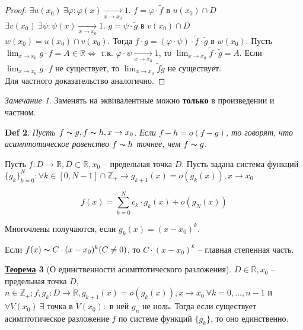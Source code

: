 \documentclass[12pt]{article}
\def\R{\mathbb{R}}       %
\def\Z{\mathbb{Z}}       %
\def\PHI{\varphi}        %
\def\EQ{\Leftrightarrow} %
\theoremstyle{definition} %
\newtheorem{Thm}{\underline{Теорема}}[subsection] %
\theoremstyle{plain} %
\newtheorem{Def}[Thm]{Def} %
\theoremstyle{remark} %
\newtheorem{Rem}[Thm]{Замечание} %
\begin{document}
\begin{proof}
    $\exists u(x_0) \ \exists \PHI : \PHI(x) \xrightarrow[x \to x_0]{} 1$. $f = \PHI \cdot \widetilde{f}$ в $u(x_0) \cap D$ \\
    $\exists v(x_0) \ \exists \psi : \psi(x) \xrightarrow[x \to x_0]{} 1$. $g = \psi \cdot \widetilde{g}$ в $v(x_0) \cap D$ \\
    $w(x_0) = u(x_0) \cap v(x_0)$. Тогда $f \cdot g = (\PHI \cdot \psi) \cdot \widetilde{f} \cdot \widetilde{g}$ в $w(x_0)$.
    Пусть $\lim_{x \to x_0} g \cdot f = A \in \R \EQ$ т.к. $\PHI \cdot \psi \xrightarrow[x \to x_0]{} 1$, то $\lim_{x \to x_0} \widetilde{f} \cdot \widetilde{g} = A$.
    Если $\lim_{x \to x_0} g \cdot f$ не существует, то $\lim_{x \to x_0} \widetilde{f}\widetilde{g}$ не существует.  \\
    Для частного доказательство аналогично.    
\end{proof}

\begin{Rem}
    Заменять на эквивалентные можно \textbf{только} в произведении и частном.
\end{Rem}

\begin{Def}
    Пусть $f \thicksim g, f \thicksim h, x \to x_0$. Если $f - h = o(f - g)$, то говорят, что асимптотическое равенство $f \thicksim h$ точнее,
    чем $f \thicksim g$.
\end{Def}

Пусть $f: D \to \R, D \subset \R, x_0$ -- предельная точка $D$.
Пусть задана система функций $\{g_k\}_{k = 0}^N : \forall k \in [0, N - 1] \cap \Z_+ \to g_{k + 1}(x) = o(g_k(x)), x \to x_0$

\[f(x) = \sum_{k=0}^{N} c_k \cdot g_k(x) + o(g_N(x))\] 

Многочлены получаются, если $g_k(x) = (x - x_0)^k$.

Если $f(x) \thicksim C \cdot (x - x_0)^k (C \neq 0)$, то $C \cdot (x - x_0)^k$ -- главная степенная часть.

\begin{Thm}[О единственности асимптотического разложения]
    $D \in \R, x_0$ -- предельная точка $D$, $n \in \Z_+; f, g_k : D \to \R, g_{k + 1}(x) = o(g_k(x)), x \to x_0 \ \forall k = 0, ..., n - 1$
    и $\forall V(x_0) \ \exists $ точка в $\dot{V}(x_0) : $ в ней $g_n$ не ноль. Тогда если существует асимптотическое разложение $f$ по системе функций $\{g_k\}$,
    то оно единственно.   
\end{Thm}
\end{document}
